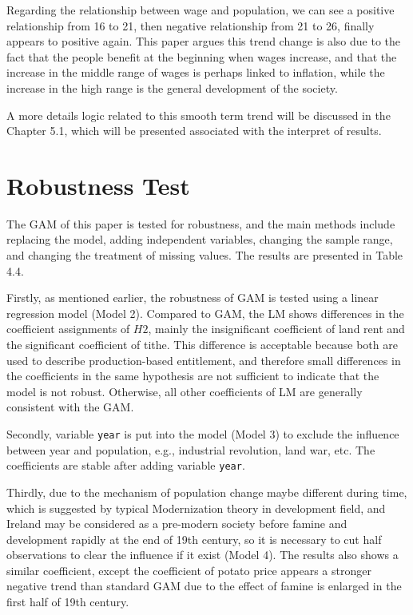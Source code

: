 Regarding the relationship between wage and population, we can see a positive relationship from 16 to 21, then negative relationship from 21 to 26, finally appears to positive again. This paper argues this trend change is also due to the fact that the people benefit at the beginning when wages increase, and that the increase in the middle range of wages is perhaps linked to inflation, while the increase in the high range is the general development of the society. 

A more details logic related to this smooth term trend will be discussed in the Chapter 5.1, which will be presented associated with the interpret of results. 

\newpage

\section{Robustness Test}

The GAM of this paper is tested for robustness, and the main methods include replacing the model, adding independent variables, changing the sample range, and changing the treatment of missing values. The results are presented in Table 4.4.

Firstly, as mentioned earlier, the robustness of GAM is tested using a linear regression model (Model 2). Compared to GAM, the LM shows differences in the coefficient assignments of $H2$, mainly the insignificant coefficient of land rent and the significant coefficient of tithe. This difference is acceptable because both are used to describe production-based entitlement, and therefore small differences in the coefficients in the same hypothesis are not sufficient to indicate that the model is not robust. Otherwise, all other coefficients of LM are generally consistent with the GAM.

Secondly, variable \texttt{year} is put into the model (Model 3) to exclude the influence between year and population, e.g., industrial revolution, land war, etc. The coefficients are stable after adding variable \texttt{year}.

Thirdly, due to the mechanism of population change maybe different during time, which is suggested by typical Modernization theory \citep{tipps1973modernization} in development field, and Ireland may be considered as a pre-modern society before famine and development rapidly at the end of 19th century, so it is necessary to cut half observations to clear the influence if it exist (Model 4). The results also shows a similar coefficient, except the coefficient of potato price appears a stronger negative trend than standard GAM due to the effect of famine is enlarged in the first half of 19th century.

